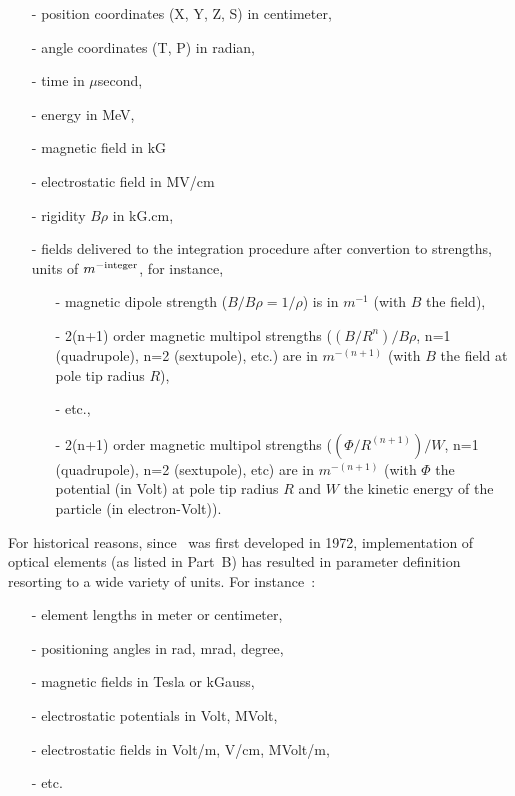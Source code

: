 {\begin{itemize}
\item[-]  position coordinates (X, Y, Z, S)  in centimeter, 
\item[-]  angle coordinates (T, P) in radian,  
\item[-]  time in $\mu$second, 
\item[-]  energy in MeV,  
\item[-]  magnetic field  in kG 
\item[-]  electrostatic field  in MV/cm 
\item[-]  rigidity $B\rho$ in kG.cm,
\item[-]  fields  delivered to the integration procedure after 
convertion to strengths, units of $m^{-\rm integer}$, for instance, 
  \begin{itemize}
  \item[-]  magnetic dipole strength ($B/B\rho = 1/\rho$) is in $m^{-1}$ (with $B$ the field), 
  \item[-]  2(n+1) order magnetic multipol strengths ($(B/R^n)/B\rho$, n=1 (quadrupole), n=2 (sextupole), etc.) are in $m^{-(n+1)}$ 
(with $B$ the field at pole tip radius $R$), 
  \item[-]  etc., 
  \item[-]  2(n+1) order magnetic multipol strengths ($(\Phi/R^{(n+1)})/W$, n=1 (quadrupole), n=2 (sextupole), etc) are in $m^{-(n+1)}$ 
  (with $\Phi$ the potential (in Volt) at pole tip radius $R$ and $W$ the kinetic energy of the particle (in electron-Volt)). 
  \end{itemize}
\end{itemize}


\medskip

\noindent For historical reasons, since \zgoubi\ was first developed in 1972, implementation of optical 
elements (as listed in Part~B) has resulted in parameter definition resorting to a wide 
variety of units. For instance~: 

\begin{itemize}
\item[-] element lengths in meter or centimeter, 
\item[-] positioning angles in rad, mrad, degree, 
\item[-] magnetic fields in Tesla or kGauss, 
\item[-] electrostatic potentials  in Volt, MVolt, 
\item[-] electrostatic fields  in Volt/m, V/cm, MVolt/m, 
\item[-] etc.
\end{itemize}


}
